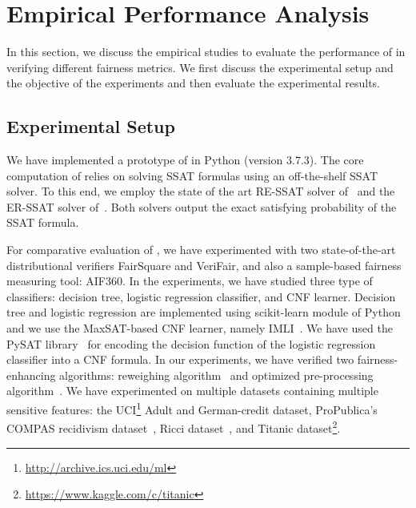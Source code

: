 \section{Empirical Performance Analysis}
\label{fairness_justicia_sec:experiments}
In this section, we discuss the empirical studies to evaluate the performance of {\justicia} in verifying different fairness metrics. We first discuss the experimental setup and the objective of the experiments and then evaluate the experimental results.
\subsection{Experimental Setup}
We have implemented a prototype of {\justicia} in Python (version $ 3.7.3 $). The core computation of {\justicia} relies on solving SSAT formulas using an off-the-shelf SSAT solver. To this end, we employ the state of the art RE-SSAT solver of~\cite{lee2017solving} and the ER-SSAT solver of~\cite{lee2018solving}. Both solvers output the exact  satisfying probability of the SSAT formula. 

For comparative evaluation of {\justicia}, we have experimented with two state-of-the-art distributional verifiers FairSquare and VeriFair, and also a sample-based fairness measuring tool: AIF360. In the experiments, we have studied three type of classifiers: decision tree, logistic regression classifier, and CNF learner. Decision tree and logistic regression are implemented using scikit-learn module of Python~\cite{PVGMTGB2011} and we use the MaxSAT-based CNF learner, namely IMLI~\cite{ghosh19incremental}. We have used the PySAT library~\cite{imms-sat18} for encoding the decision function of the logistic regression classifier into a CNF formula. In our experiments, we have verified two fairness-enhancing algorithms: reweighing algorithm~\cite{kamiran2012data} and optimized pre-processing  algorithm~\cite{calmon2017optimized}. 
We have experimented on multiple datasets containing multiple sensitive features: the UCI\footnote{\url{ http://archive.ics.uci.edu/ml}} Adult and German-credit dataset,  ProPublica’s COMPAS recidivism dataset~\cite{angwin2016machine}, Ricci dataset~\cite{mcginley2010ricci}, and Titanic dataset\footnote{\url{https://www.kaggle.com/c/titanic}}.

